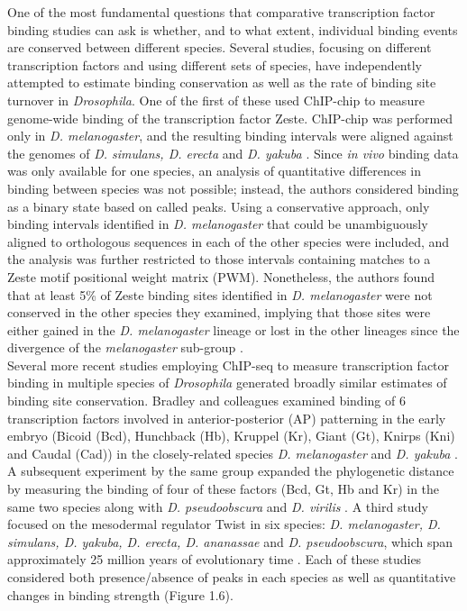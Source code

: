 One of the most fundamental questions that comparative transcription factor binding studies can ask is whether, and to what extent, individual binding events are conserved between different species. Several studies, focusing on different transcription factors and using different sets of species, have independently attempted to estimate binding conservation as well as the rate of binding site turnover in \emph{Drosophila}. One of the first of these used ChIP-chip to measure genome-wide binding of the transcription factor Zeste. ChIP-chip was performed only in \emph{D. melanogaster}, and the resulting binding intervals were aligned against the genomes of \emph{D. simulans, D. erecta} and \emph{D. yakuba} \citep{moses_large-scale_2006}. Since \emph{in vivo} binding data was only available for one species, an analysis of quantitative differences in binding between species was not possible; instead, the authors considered binding as a binary state based on called peaks. Using a conservative approach, only binding intervals identified in \emph{D. melanogaster} that could be unambiguously aligned to orthologous sequences in each of the other species were included, and the analysis was further restricted to those intervals containing matches to a Zeste motif positional weight matrix (PWM). Nonetheless, the authors found that at least 5\% of Zeste binding sites identified in \emph{D. melanogaster} were not conserved in the other species they examined, implying that those sites were either gained in the \emph{D. melanogaster} lineage or lost in the other lineages since the divergence of the \emph{melanogaster} sub-group \citep{moses_large-scale_2006}.\\

Several more recent studies employing ChIP-seq to measure transcription factor binding in multiple species of \emph{Drosophila} generated broadly similar estimates of binding site conservation. Bradley and colleagues examined binding of 6 transcription factors involved in anterior-posterior (AP) patterning in the early embryo (Bicoid (Bcd), Hunchback (Hb), Kruppel (Kr), Giant (Gt), Knirps (Kni) and Caudal (Cad)) in the closely-related species \emph{D. melanogaster} and \emph{D. yakuba} \citep{bradley_binding_2010}. A subsequent experiment by the same group expanded the phylogenetic distance by measuring the binding of four of these factors (Bcd, Gt, Hb and Kr) in the same two species along with \emph{D. pseudoobscura} and \emph{D. virilis} \citep{paris_extensive_2013}. A third study focused on the mesodermal regulator Twist in six species: \emph{D. melanogaster, D. simulans, D. yakuba, D. erecta, D. ananassae} and \emph{D. pseudoobscura}, which span approximately 25 million years of evolutionary time \citep{he_high_2011}. Each of these studies considered both presence/absence of peaks in each species as well as quantitative changes in binding strength (Figure 1.6).\\ 


